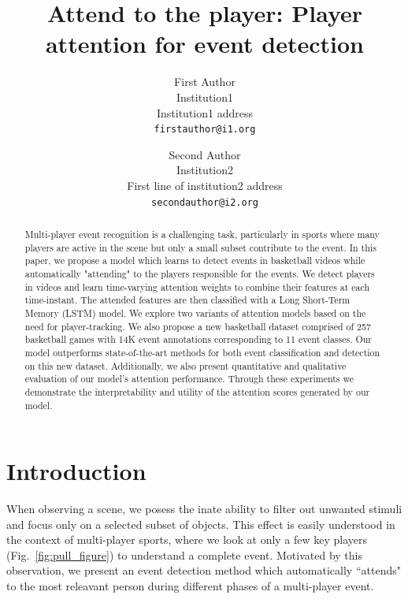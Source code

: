 \documentclass[10pt,twocolumn,letterpaper]{article}
\begin{document}
\title{Attend to the player: Player attention for event detection}

\author{First Author\\
Institution1\\
Institution1 address\\
{\tt\small firstauthor@i1.org}
\and
Second Author\\
Institution2\\
First line of institution2 address\\
{\tt\small secondauthor@i2.org}
}

\maketitle

\begin{abstract}
Multi-player event recognition is a challenging task, particularly in sports
where many players are active in the scene but only a small subset
contribute to the event. In this paper, we propose a model which learns to
detect events in basketball videos while automatically "attending" to the
players responsible for the events. We detect players in videos and learn
time-varying attention weights to combine their features at each time-instant.
The attended features are then classified with a Long Short-Term Memory (LSTM)
model.  We explore two variants of attention models based on the need for
player-tracking.  We also propose a new basketball dataset comprised of 257
basketball games with 14K event annotations corresponding to 11
event classes.  Our model outperforms state-of-the-art methods for both event
classification and detection on this new dataset. Additionally, we also present
quantitative and qualitative evaluation of our model's attention performance.
Through these experiments we demonstrate the interpretability and utility of
the attention scores generated by our model.
\end{abstract}

\section{Introduction}
When observing a scene, we posess the inate ability to filter out unwanted
stimuli \cite{Desimone_ARN95} and focus only on a selected subset of objects.
This effect is easily understood in the context of multi-player sports, where
we look at only a few key players (Fig.~\ref{fig:pull_figure}) to understand a
complete event. Motivated by this observation, we present an event detection
method which automatically ``attends" to the most releavant person during
different phases of a multi-player event.
\end{document}
